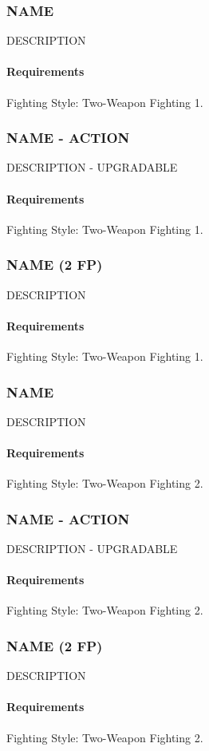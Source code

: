 \subsubsection{NAME} \label{feat::name}
    DESCRIPTION
    \paragraph{Requirements} Fighting Style: Two-Weapon Fighting 1.
\subsubsection{NAME - ACTION} \label{feat::name}
    DESCRIPTION - UPGRADABLE
    \paragraph{Requirements} Fighting Style: Two-Weapon Fighting 1.
\subsubsection{NAME (2 FP)} \label{feat::name}
    DESCRIPTION
    \paragraph{Requirements} Fighting Style: Two-Weapon Fighting 1.
\subsubsection{NAME} \label{feat::name}
    DESCRIPTION
    \paragraph{Requirements} Fighting Style: Two-Weapon Fighting 2.
\subsubsection{NAME - ACTION} \label{feat::name}
    DESCRIPTION - UPGRADABLE
    \paragraph{Requirements} Fighting Style: Two-Weapon Fighting 2.
\subsubsection{NAME (2 FP)} \label{feat::name}
    DESCRIPTION
    \paragraph{Requirements} Fighting Style: Two-Weapon Fighting 2.
